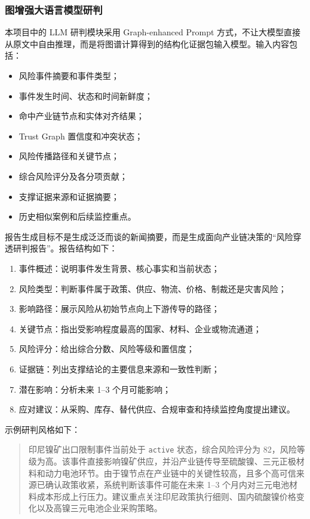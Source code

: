 ﻿\documentclass[12pt,a4paper]{article}
\begin{document}
\subsubsection{图增强大语言模型研判}

本项目中的 LLM 研判模块采用 Graph-enhanced Prompt 方式，不让大模型直接从原文中自由推理，而是将图谱计算得到的结构化证据包输入模型。输入内容包括：
\begin{itemize}
    \item 风险事件摘要和事件类型；
    \item 事件发生时间、状态和时间新鲜度；
    \item 命中产业链节点和实体对齐结果；
    \item Trust Graph 置信度和冲突状态；
    \item 风险传播路径和关键节点；
    \item 综合风险评分及各分项贡献；
    \item 支撑证据来源和证据摘要；
    \item 历史相似案例和后续监控重点。
\end{itemize}

报告生成目标不是生成泛泛而谈的新闻摘要，而是生成面向产业链决策的“风险穿透研判报告”。报告结构如下：
\begin{enumerate}
    \item 事件概述：说明事件发生背景、核心事实和当前状态；
    \item 风险类型：判断事件属于政策、供应、物流、价格、制裁还是灾害风险；
    \item 影响路径：展示风险从初始节点向上下游传导的路径；
    \item 关键节点：指出受影响程度最高的国家、材料、企业或物流通道；
    \item 风险评分：给出综合分数、风险等级和置信度；
    \item 证据链：列出支撑结论的主要信息来源和一致性判断；
    \item 潜在影响：分析未来 1--3 个月可能影响；
    \item 应对建议：从采购、库存、替代供应、合规审查和持续监控角度提出建议。
\end{enumerate}

示例研判风格如下：
\begin{quote}
印尼镍矿出口限制事件当前处于 \texttt{active} 状态，综合风险评分为 82，风险等级为高。该事件直接影响镍矿供应，并沿产业链传导至硫酸镍、三元正极材料和动力电池环节。由于镍节点在产业链中的关键性较高，且多个高可信来源已确认政策收紧，系统判断该事件可能在未来 1--3 个月内对三元电池材料成本形成上行压力。建议重点关注印尼政策执行细则、国内硫酸镍价格变化以及高镍三元电池企业采购策略。
\end{quote}
\end{document}
